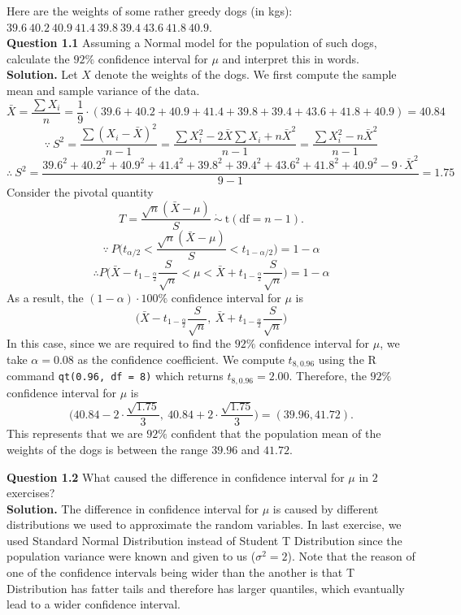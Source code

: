\documentclass[
]{book}
\begin{document}
Here are the weights of some rather greedy dogs (in kgs): \(39.6 \ 40.2 \ 40.9 \ 41.4 \ 39.8 \ 39.4 \ 43.6 \ 41.8 \ 40.9\).\\
\textbf{Question 1.1} Assuming a Normal model for the population of such dogs, calculate the \(92\%\) confidence interval for \(\mu\) and interpret this in words.\\
\textbf{Solution.} Let \(X\) denote the weights of the dogs. We first compute the sample mean and sample variance of the data.
\[\bar{X} = \frac{\sum X_i}{n} = \frac{1}{9} \cdot (39.6+40.2+40.9+41.4+39.8+39.4+43.6+41.8+40.9) = 40.84\]
\[\because \ S^2 = \frac{\sum (X_i - \bar{X})^2}{n-1} = \frac{\sum X_i^2 - 2\bar{X}\sum X_i + n\bar{X}^2}{n-1} = \frac{\sum X_i^2 - n \bar{X}^2}{n-1}\]
\[\therefore \ S^2 = \frac{39.6^2 + 40.2^2 + 40.9^2 + 41.4^2 + 39.8^2 + 39.4^2 + 43.6^2 + 41.8^2 + 40.9^2 - 9 \cdot \bar{X}^2}{9-1} = 1.75\]
Consider the pivotal quantity
\[T = \frac{\sqrt{n}(\bar{X}-\mu)}{S} \ \dot\sim \ \text{t}(\text{df} = n-1).\]
\[\because \ P \bigg(t_{\alpha/2} < \frac{\sqrt{n}(\bar{X}-\mu)}{S} < t_{1-\alpha/2} \bigg) = 1 - \alpha\]
\[\therefore P \bigg(\bar{X} - t_{1-\frac{\alpha}{2}} \frac{S}{\sqrt{n}} < \mu < \bar{X} + t_{1-\frac{\alpha}{2}} \frac{S}{\sqrt{n}} \bigg) = 1 - \alpha\]
As a result, the \((1-\alpha) \cdot 100\%\) confidence interval for \(\mu\) is
\[\bigg(\bar{X} - t_{1-\frac{\alpha}{2}} \frac{S}{\sqrt{n}}, \ \bar{X} + t_{1-\frac{\alpha}{2}} \frac{S}{\sqrt{n}} \bigg)\]
In this case, since we are required to find the \(92\%\) confidence interval for \(\mu\), we take \(\alpha = 0.08\) as the confidence coefficient. We compute \(t_{8, 0.96}\) using the R command \texttt{qt(0.96,\ df\ =\ 8)} which returns \(t_{8, 0.96} = 2.00\).
Therefore, the \(92\%\) confidence interval for \(\mu\) is
\[\bigg( 40.84 - 2 \cdot  \frac{\sqrt{1.75}}{3}, \ 40.84 + 2 \cdot  \frac{\sqrt{1.75}}{3} \bigg) = (39.96, 41.72).\]
This represents that we are \(92\%\) confident that the population mean of the weights of the dogs is between the range \(39.96\) and \(41.72\).

\textbf{Question 1.2} What caused the difference in confidence interval for \(\mu\) in \(2\) exercises?\\
\textbf{Solution.} The difference in confidence interval for \(\mu\) is caused by different distributions we used to approximate the random variables. In last exercise, we used Standard Normal Distribution instead of Student T Distribution since the population variance were known and given to us (\(\sigma^2 = 2\)). Note that the reason of one of the confidence intervals being wider than the another is that T Distribution has fatter tails and therefore has larger quantiles, which evantually lead to a wider confidence interval.
\end{document}
